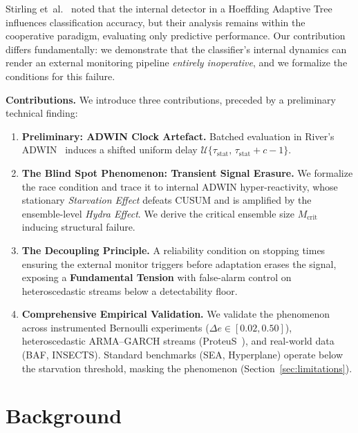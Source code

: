 \documentclass[10pt,conference]{IEEEtran}
\theoremstyle{definition}
\begin{document}
Stirling et~al.~\cite{stirling_2018} noted that the internal detector in a Hoeffding Adaptive Tree influences classification accuracy, but their analysis remains within the cooperative paradigm, evaluating only predictive performance. Our contribution differs fundamentally: we demonstrate that the classifier's internal dynamics can render an external monitoring pipeline \emph{entirely inoperative}, and we formalize the conditions for this failure.

\noindent\textbf{Contributions.}
We introduce three contributions, preceded by a preliminary technical finding:
\begin{enumerate}[nosep, label=\textbf{(C\arabic*)}, start=1]
  \item[\textbf{(P)}] \textbf{Preliminary: ADWIN Clock Artefact.} Batched evaluation in River's ADWIN~\cite{montiel_river_2021} induces a shifted uniform delay $\mathcal{U}\{\tau_{\mathrm{stat}},\, \tau_{\mathrm{stat}} + c - 1\}$.
  \item \textbf{The Blind Spot Phenomenon: Transient Signal Erasure.} We formalize the race condition and trace it to internal ADWIN hyper-reactivity, whose stationary \emph{Starvation Effect} defeats CUSUM and is amplified by the ensemble-level \emph{Hydra Effect}. We derive the critical ensemble size $M_{\mathrm{crit}}$ inducing structural failure.
  \item \textbf{The Decoupling Principle.} A reliability condition on stopping times ensuring the external monitor triggers before adaptation erases the signal, exposing a \textbf{Fundamental Tension} with false-alarm control on heteroscedastic streams below a detectability floor.
  \item \textbf{Comprehensive Empirical Validation.} We validate the phenomenon across instrumented Bernoulli experiments ($\Delta e \in [0.02, 0.50]$), heteroscedastic ARMA--GARCH streams (ProteuS~\cite{suarez_cetrulo_proteus_2025}), and real-world data (BAF, INSECTS). Standard benchmarks (SEA, Hyperplane) operate below the starvation threshold, masking the phenomenon (Section~\ref{sec:limitations}).
\end{enumerate}

\section{Background}\label{sec:background}
\end{document}
